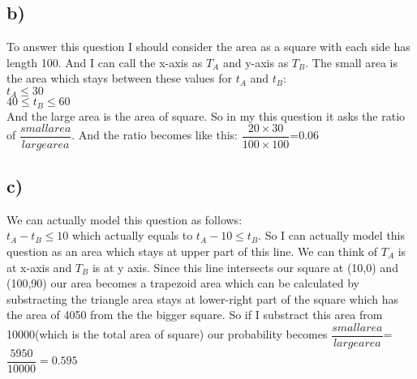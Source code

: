 \documentclass[12pt]{article}
\begin{document}
\subsection*{b)} 
To answer this question I should consider the area as a square with each side has length 100. And I can call the x-axis as $T_A$ and y-axis as $T_B$. The small area is the area which stays between these values for $t_A$ and $t_B$:\\
$t_A\leq30$\\
$40 \leq t_B\le60$\\
And the large area is the area of square. So in my this question it asks the ratio of $\dfrac{smallarea}{largearea}$. And the ratio becomes like this: $\dfrac{20\times 30}{100\times100}$=0.06\\




\subsection*{c)} 
We can actually model this question as follows:\\
$t_A-t_B\leq10$ which actually equals to $t_A-10\leq t_B$. So I can actually model this question as an area which stays at upper part of this line. We can think of $T_A$ is at x-axis and $T_B$ is at y axis. Since this line intersects our square at (10,0) and (100,90) our area becomes a trapezoid area which can be calculated by substracting the triangle area stays at lower-right part of the square which has the area of 4050 from the the bigger square. So if I substract this area from 10000(which is the total area of square) our probability becomes $\dfrac{smallarea}{largearea}$=$\dfrac{5950}{10000}=0.595$\\
\end{document}
